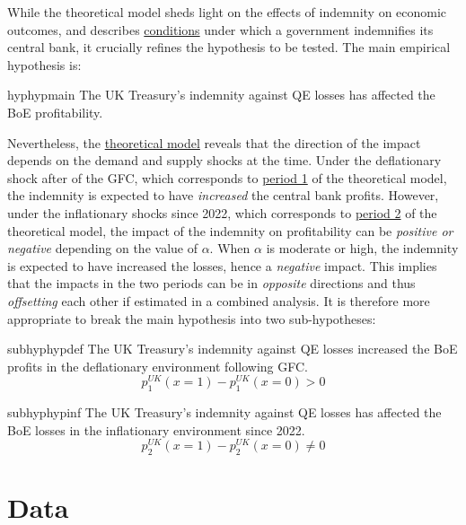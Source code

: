 \documentclass[
  a4paper,
  abstract=true]{scrartcl}
\theoremstyle{definition}
\begin{document}
While the theoretical model sheds light on the effects of indemnity on
economic outcomes, and describes \hyperref[sec-indemnity]{conditions}
under which a government indemnifies its central bank, it crucially
refines the hypothesis to be tested. The main empirical hypothesis is:

\begin{restatable}[$H_{1}$]{hyp}{hypmain}
\label{hyp-main}
The UK Treasury's indemnity against QE losses has affected the BoE profitability.
\end{restatable}

Nevertheless, the \hyperref[sec-simulation]{theoretical model} reveals
that the direction of the impact depends on the demand and supply shocks
at the time. Under the deflationary shock after of the GFC, which
corresponds to \hyperref[sec-sim-def]{period 1} of the theoretical
model, the indemnity is expected to have \emph{increased} the central
bank profits. However, under the inflationary shocks since 2022, which
corresponds to \hyperref[sec-sim-inf]{period 2} of the theoretical
model, the impact of the indemnity on profitability can be
\emph{positive or negative} depending on the value of \(\alpha\). When
\(\alpha\) is moderate or high, the indemnity is expected to have
increased the losses, hence a \emph{negative} impact. This implies that
the impacts in the two periods can be in \emph{opposite} directions and
thus \emph{offsetting} each other if estimated in a combined analysis.
It is therefore more appropriate to break the main hypothesis into two
sub-hypotheses:

\begin{restatable}[$H_{1a}$]{subhyp}{hypdef}
\label{hyp-def}
The UK Treasury's indemnity against QE losses increased the BoE profits in the deflationary environment following GFC.
$$p_1^{UK}(x=1)-p_1^{UK}(x=0)>0$$
\end{restatable}
\begin{restatable}[$H_{1b}$]{subhyp}{hypinf}
\label{hyp-inf}
The UK Treasury's indemnity against QE losses has affected the BoE losses in the inflationary environment since 2022.
$$p_2^{UK}(x=1)-p_2^{UK}(x=0)\neq0$$
\end{restatable}

\section{Data}\label{sec-data}
\end{document}
